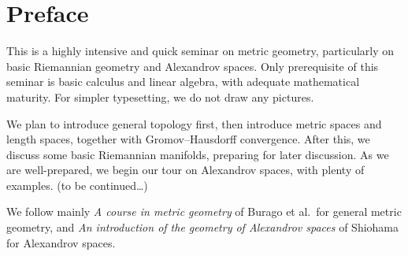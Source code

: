 \chapter{Preface}

This is a highly intensive and quick seminar on metric geometry, particularly on basic Riemannian geometry and Alexandrov spaces.
Only prerequisite of this seminar is basic calculus and linear algebra, with adequate mathematical maturity.
For simpler typesetting, we do not draw any pictures.

We plan to introduce general topology first, then introduce metric spaces and length spaces, together with Gromov--Hausdorff convergence.
After this, we discuss some basic Riemannian manifolds, preparing for later discussion.
As we are well-prepared, we begin our tour on Alexandrov spaces, with plenty of examples.
(to be continued\dots)

We follow mainly \emph{A course in metric geometry} of Burago et al.\ for general metric geometry, and \emph{An introduction of the geometry of Alexandrov spaces} of Shiohama for Alexandrov spaces.